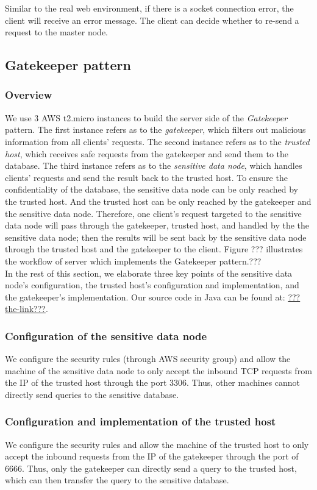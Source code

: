 \documentclass{article}
\begin{document}
Similar to the real web environment, if there is a socket connection error, the client will receive an error message. The client can decide whether to re-send a request to the master node.

\subsection{Gatekeeper pattern}
\subsubsection{Overview}
We use 3 AWS t2.micro instances to build the server side of the \emph{Gatekeeper} pattern. The first instance refers as to the \emph{gatekeeper}, which filters out malicious information from all clients' requests. The second instance refers as to the \emph{trusted host}, which receives safe requests from the gatekeeper and send them to the database. The third instance refers as to the \emph{sensitive data node}, which handles clients' requests and send the result back to the trusted host. To ensure the confidentiality of the database, the sensitive data node can be only reached by the trusted host. And the trusted host can be only reached by the gatekeeper and the sensitive data node. Therefore, one client's request targeted to the sensitive data node will pass through the gatekeeper, trusted host, and handled by the the sensitive data node; then the results will be sent back by the sensitive data node through the trusted host and the gatekeeper to the client. Figure ??? illustrates the workflow of server which implements the Gatekeeper pattern.???\\

In the rest of this section, we elaborate three key points of the sensitive data node's configuration, the trusted host's configuration and implementation, and the gatekeeper's implementation. Our source code in Java can be found at: \url{???the-link???}.

\subsubsection{Configuration of the sensitive data node}
We configure the security rules (through AWS security group) and allow the machine of the sensitive data node to only accept the inbound TCP requests from the IP of the trusted host through the port 3306. Thus, other machines cannot directly send queries to the sensitive database.

\subsubsection{Configuration and implementation of the trusted host}
We configure the security rules and allow the machine of the trusted host to only accept the inbound requests from the IP of the gatekeeper through the port of 6666. Thus, only the gatekeeper can directly send a query to the trusted host, which can then transfer the query to the sensitive database.\\
\end{document}
